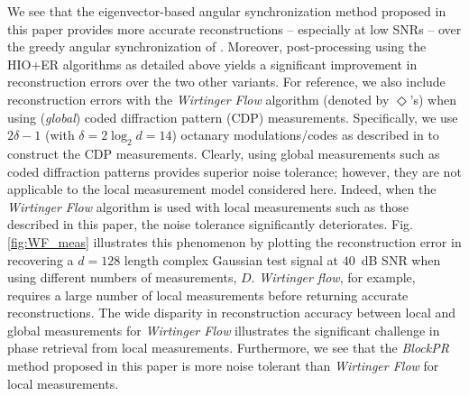 We see that the eigenvector-based angular synchronization method proposed in this paper provides more accurate reconstructions -- especially at low SNRs -- over the greedy angular synchronization of \cite{IVW2015_FastPhase}. Moreover, post-processing using the HIO+ER algorithms as detailed above yields a significant improvement in reconstruction errors over the two other variants. For reference, we also include reconstruction errors with the {\em Wirtinger Flow} algorithm (denoted by $\Diamond$'s) when using ({\em global}) coded diffraction pattern (CDP) measurements. Specifically, we use $2\delta-1$ (with $\delta = 2\log_2d = 14$) octanary modulations/codes as described in \cite[\S 1.5, (1.9)]{Candes2014WF} to construct the CDP measurements. Clearly, using global measurements such as coded diffraction patterns provides superior noise tolerance; however, they are not applicable to the local measurement model considered here.  Indeed, when the {\em Wirtinger Flow} algorithm is used with local measurements such as those described in this paper, the noise tolerance significantly deteriorates. Fig. \ref{fig:WF_meas} illustrates this phenomenon by plotting the reconstruction error in recovering a $d=128$ length complex Gaussian test signal at $40$~dB SNR when using different numbers of measurements, $D$. {\em Wirtinger flow}, for example, requires a large number of local measurements before returning accurate reconstructions. 
The wide disparity in reconstruction accuracy between local and global measurements for {\em Wirtinger Flow} illustrates the significant challenge in phase retrieval from local measurements. Furthermore, we see that the {\em BlockPR} method proposed in this paper is more noise tolerant than {\em Wirtinger Flow} for local measurements.
%
